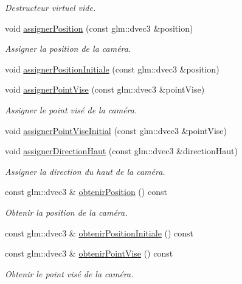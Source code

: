 \begin{DoxyCompactItemize}
\begin{DoxyCompactList}\small\item\em Destructeur virtuel vide. \end{DoxyCompactList}\item 
void \hyperlink{classvue_1_1_camera_a452efa2c96225b1207cc9ac74be0bda5}{assigner\-Position} (const glm\-::dvec3 \&position)
\begin{DoxyCompactList}\small\item\em Assigner la position de la caméra. \end{DoxyCompactList}\item 
void \hyperlink{classvue_1_1_camera_a73e6c0d4915b3ee6f007e0630fb7dcc0}{assigner\-Position\-Initiale} (const glm\-::dvec3 \&position)
\item 
void \hyperlink{classvue_1_1_camera_a0b9982453adc3afc38f9198ab8b1dd2a}{assigner\-Point\-Vise} (const glm\-::dvec3 \&point\-Vise)
\begin{DoxyCompactList}\small\item\em Assigner le point visé de la caméra. \end{DoxyCompactList}\item 
void \hyperlink{classvue_1_1_camera_a38a36bcc9a9039f20c1f00ea6266bffb}{assigner\-Point\-Vise\-Initial} (const glm\-::dvec3 \&point\-Vise)
\item 
void \hyperlink{classvue_1_1_camera_a94afd2172d111edacc248522f201fd32}{assigner\-Direction\-Haut} (const glm\-::dvec3 \&direction\-Haut)
\begin{DoxyCompactList}\small\item\em Assigner la direction du haut de la caméra. \end{DoxyCompactList}\item 
const glm\-::dvec3 \& \hyperlink{classvue_1_1_camera_aca05463d00f938ceb637b49eaf25f330}{obtenir\-Position} () const 
\begin{DoxyCompactList}\small\item\em Obtenir la position de la caméra. \end{DoxyCompactList}\item 
const glm\-::dvec3 \& \hyperlink{classvue_1_1_camera_acdd25110918bd9019316568a838c717c}{obtenir\-Position\-Initiale} () const 
\item 
const glm\-::dvec3 \& \hyperlink{classvue_1_1_camera_a20cab3b4e97dbe681dc9532e459bbf08}{obtenir\-Point\-Vise} () const 
\begin{DoxyCompactList}\small\item\em Obtenir le point visé de la caméra. \end{DoxyCompactList}\item 

\end{DoxyCompactItemize}
